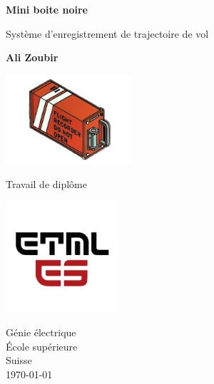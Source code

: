 \begin{titlepage}
   \begin{center}
        \vspace*{1cm}
        \LARGE
        {\Huge \textbf{Mini boite noire}}
        
        \vspace{0.3cm}
        Système d'enregistrement de trajectoire de vol
            
        \vspace{1.5cm}

        \textbf{Ali Zoubir} \vspace{5mm}
        
        \includegraphics[width=0.35\textwidth]{./LOGO-PROJ.png}

        \vfill
            
        Travail de diplôme
            
        \vspace{0.8cm}
     
        \includegraphics[width=0.31\textwidth]{./ETML-ES-LOGO.png}

        Génie électrique\\
        École supérieure\\
        Suisse\\
        \monthyeardate\today
            
   \end{center}
\end{titlepage}